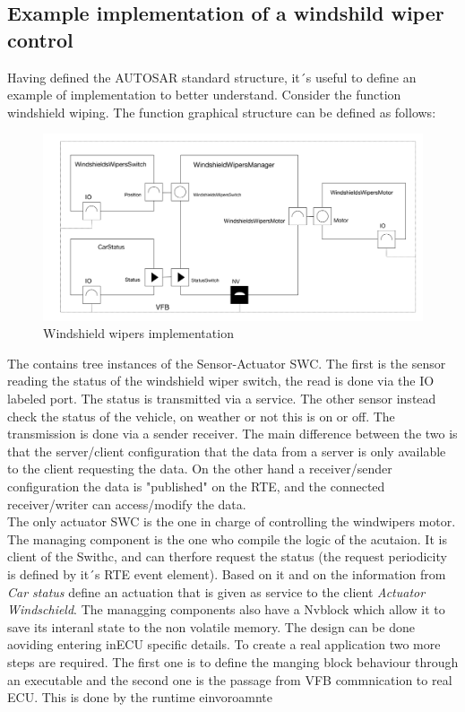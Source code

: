 \documentclass[../main.tex]{subfiles}
\begin{document}
\subsection{Example implementation of a windshild wiper control}
Having defined the AUTOSAR standard structure, it´s useful to define an example of implementation to better understand. Consider the function windshield wiping. The function graphical structure can be defined as follows:
\begin{figure}[H]
    \centering
    \includegraphics[width=\linewidth]{images_folder/windshield_WIpers_aUtosar.jpeg}
    \caption{Windshield wipers implementation}
    \label{fig:WINWIP}
\end{figure}
The contains tree instances of the Sensor-Actuator SWC. The first is the sensor reading the status of the windshield wiper switch, the read is done via the IO labeled port. The status is transmitted via a service. The other sensor instead check the status of the vehicle, on weather or not this is on or off. The transmission is done via a sender receiver. The main difference between the two is that the server/client configuration that the data from a server is only available to the client requesting the data. On the other hand a receiver/sender configuration the data is "published" on the RTE, and the connected receiver/writer can access/modify the data.\\
The only actuator SWC is the one in charge of controlling the windwipers motor. The managing component is the one who compile the logic of the acutaion. It is client of the Swithc, and can therfore request the status (the request periodicity is defined by it´s RTE event element). Based on it and on the information from \textit{Car status} define an actuation that is given as service to the client \textit{Actuator Windschield}. The managging components also have a Nvblock which allow it to save its interanl state to the non volatile memory. 
The design can be done aoviding entering inECU specific details. To create a real application two more steps are required. The first one is to define the manging block behaviour through an executable and the second one is the passage from VFB commnication to real ECU. This is done by the runtime einvoroamnte 
\end{document}
